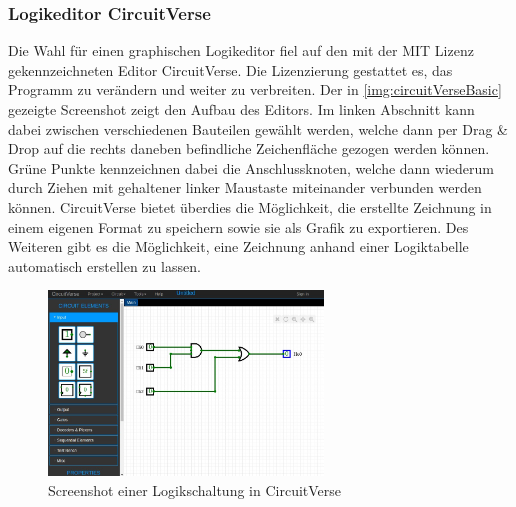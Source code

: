 \subsubsection{Logikeditor CircuitVerse}\label{kap:circuitVerse}
Die Wahl für einen graphischen Logikeditor fiel auf den mit der MIT Lizenz gekennzeichneten Editor CircuitVerse.\cite{URL:CircuitVerse} Die Lizenzierung gestattet es, das Programm zu verändern und weiter zu verbreiten. Der in \autoref{img:circuitVerseBasic} gezeigte Screenshot zeigt den Aufbau des Editors. Im linken Abschnitt kann dabei zwischen verschiedenen Bauteilen gewählt werden, welche dann per Drag \& Drop auf die rechts daneben befindliche Zeichenfläche gezogen werden können. Grüne Punkte kennzeichnen dabei die Anschlussknoten, welche dann wiederum durch Ziehen mit gehaltener linker Maustaste miteinander verbunden werden können. CircuitVerse bietet überdies die Möglichkeit, die erstellte Zeichnung in einem eigenen Format zu speichern sowie sie als Grafik zu exportieren. Des Weiteren gibt es die Möglichkeit, eine Zeichnung anhand einer Logiktabelle automatisch erstellen zu lassen. 

\begin{figure}[H]
	\begin{center}
		\includegraphics[width=0.65\textwidth ,clip]{./images/circuitverse.jpg}
		\caption{Screenshot einer Logikschaltung in CircuitVerse}
		\label{img:circuitVerseBasic}
	\end{center} 
\end{figure}	

